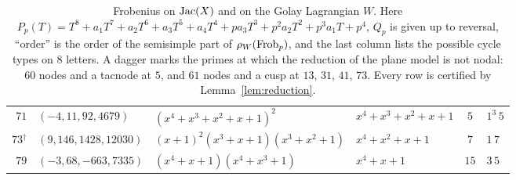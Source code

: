 \begin{table}[ht]
\begin{tabular}{@{}rlllcl@{}}
$71$ & $(-4, 11, 92, 4679)$ & $(x^{4}+x^{3}+x^{2}+x+1)^{2}$ & $x^{4}+x^{3}+x^{2}+x+1$ & $5$ & $1^{3}\,5$\\
$73$$^\dagger$ & $(9, 146, 1428, 12030)$ & $(x+1)^{2}(x^{3}+x+1)(x^{3}+x^{2}+1)$ & $x^{4}+x^{2}+x+1$ & $7$ & $1\,7$\\
$79$ & $(-3, 68, -663, 7335)$ & $(x^{4}+x+1)(x^{4}+x^{3}+1)$ & $x^{4}+x+1$ & $15$ & $3\,5$\\
\bottomrule
\end{tabular}
\caption{Frobenius on $\operatorname{Jac}(X)$ and on the Golay Lagrangian $W$. Here $P_p(T)=T^8+a_1T^7+a_2T^6+a_3T^5+a_4T^4+pa_3T^3+p^2a_2T^2+p^3a_1T+p^4$, $Q_p$ is given up to reversal, ``order'' is the order of the semisimple part of $\rho_W(\operatorname{Frob}_p)$, and the last column lists the possible cycle types on $8$ letters. A dagger marks the primes at which the reduction of the plane model is not nodal: $60$ nodes and a tacnode at $5$, and $61$ nodes and a cusp at $13$, $31$, $41$, $73$. Every row is certified by Lemma~\ref{lem:reduction}.}
\label{tab:frobenius}
\end{table}
